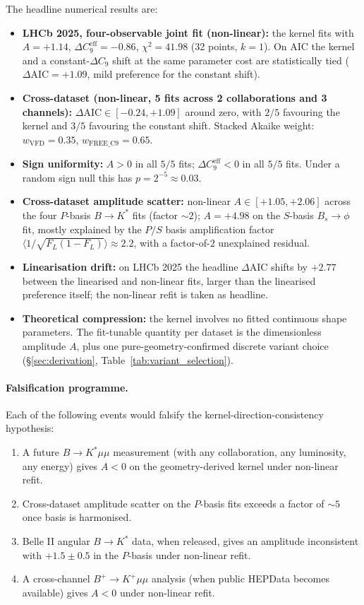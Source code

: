 The headline numerical results are:
\begin{itemize}
\item \textbf{LHCb 2025, four-observable joint fit (non-linear):}
  the kernel fits with $A=+1.14$,
  $\Delta C_{9}^{\mathrm{eff}}=-0.86$, $\chi^{2}=41.98$ (32 points,
  $k=1$). On AIC the kernel and a constant-$\Delta C_{9}$ shift at
  the same parameter cost are statistically tied
  ($\Delta\mathrm{AIC}=+1.09$, mild preference for the constant
  shift).
\item \textbf{Cross-dataset (non-linear, 5 fits across 2
  collaborations and 3 channels):} $\Delta\mathrm{AIC}\in
  [-0.24, +1.09]$ around zero, with $2/5$ favouring the kernel and
  $3/5$ favouring the constant shift. Stacked Akaike weight:
  $w_{\mathrm{VFD}}=0.35$, $w_{\mathrm{FREE\_C9}}=0.65$.
\item \textbf{Sign uniformity:} $A>0$ in all $5/5$ fits;
  $\Delta C_{9}^{\mathrm{eff}}<0$ in all $5/5$ fits. Under a random
  sign null this has $p=2^{-5}\approx 0.03$.
\item \textbf{Cross-dataset amplitude scatter:} non-linear
  $A\in[+1.05,+2.06]$ across the four $P$-basis $B\to K^{*}$ fits
  (factor $\sim 2$); $A=+4.98$ on the $S$-basis $B_{s}\!\to\!\phi$
  fit, mostly explained by the $P/S$ basis amplification factor
  $\langle 1/\sqrt{F_{L}(1-F_{L})}\rangle\approx 2.2$, with a
  factor-of-$2$ unexplained residual.
\item \textbf{Linearisation drift:} on LHCb 2025 the headline
  $\Delta\mathrm{AIC}$ shifts by $+2.77$ between the linearised and
  non-linear fits, larger than the linearised preference itself; the
  non-linear refit is taken as headline.
\item \textbf{Theoretical compression:} the kernel involves no fitted
  continuous shape parameters. The fit-tunable quantity per dataset
  is the dimensionless amplitude $A$, plus one
  pure-geometry-confirmed discrete variant choice
  (\S\ref{sec:derivation}, Table~\ref{tab:variant_selection}).
\end{itemize}

\paragraph{Falsification programme.} Each of the following events would
falsify the kernel-direction-consistency hypothesis:
\begin{enumerate}
\item A future $B\to K^{*}\mu\mu$ measurement (with any collaboration,
  any luminosity, any energy) gives $A<0$ on the geometry-derived kernel
  under non-linear refit.
\item Cross-dataset amplitude scatter on the $P$-basis fits exceeds
  a factor of $\sim 5$ once basis is harmonised.
\item Belle II angular $B\to K^{*}$ data, when released, gives an
  amplitude inconsistent with $+1.5\pm 0.5$ in the $P$-basis
  under non-linear refit.
\item A cross-channel $B^{+}\to K^{+}\mu\mu$ analysis (when public
  HEPData becomes available) gives $A<0$ under non-linear refit.
\end{enumerate}

